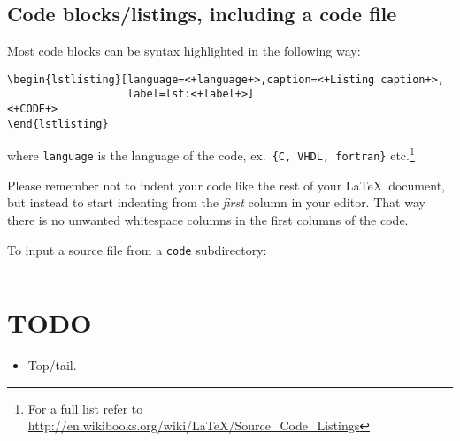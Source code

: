 \subsection{Code blocks\slash listings, including a code file}
Most code blocks can be syntax highlighted in the following way:
\begin{verbatim}
\begin{lstlisting}[language=<+language+>,caption=<+Listing caption+>, 
                   label=lst:<+label+>]
<+CODE+>
\end{lstlisting}
\end{verbatim}
where \texttt{language} is the language of the code, ex.\ \texttt{\{C, VHDL, fortran\}} etc.\footnote{For a full list refer to \url{http://en.wikibooks.org/wiki/LaTeX/Source_Code_Listings}}


Please remember not to indent your code like the rest of your \LaTeX\ document, but instead to start indenting from the \emph{first} column in your editor. That way there is no unwanted whitespace columns in the first columns of the code.


To input a source file from a \texttt{code} subdirectory:
\begin{verbatim}

\end{verbatim}

\clearpage
\section*{TODO}
\begin{itemize}
\item Top\slash tail.
\end{itemize}


